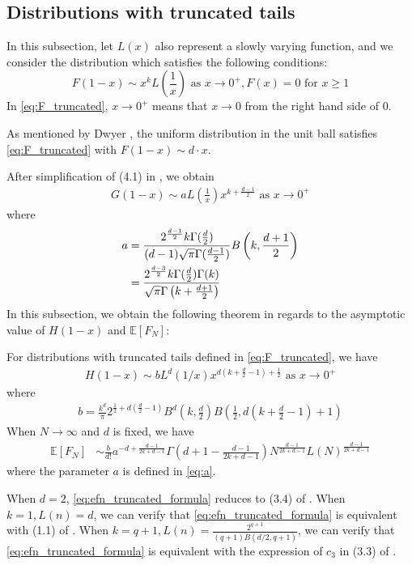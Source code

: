 \documentclass{aptpub}
\def\E{\mathbb{E}}
\begin{document}
\subsection{Distributions with truncated tails}
In this subsection, let $L(x)$ also represent a slowly varying function, and we consider the distribution which satisfies
the following conditions:
\begin{equation}\label{eq:F_truncated}
     F(1-x) \sim x^k L\left(\frac{1}{x} \right)  \text{ as } x \to 0^+,
     F(x) = 0 \text{ for } x \geq 1
\end{equation}
In \eqref{eq:F_truncated}, $x \to 0^+$ means that $x\to 0$ from the right hand side of $0$.

As mentioned by Dwyer \cite{dwyer1991convex}, the uniform distribution
in the unit ball satisfies \eqref{eq:F_truncated} with
$F(1-x) \sim d\cdot x$.

After simplification of (4.1) in \cite{dwyer1991convex}, we obtain
\begin{align}
    G(1-x) \sim a
    L\left(\frac{1}{x} \right)
    x^{k+\frac{d-1}{2}} \textrm{ as } x \to 0^+ 
    \label{eq:truncated_G_1_x}
\end{align}
where
\begin{align}
a &=\frac{2^{\frac{d-1}{2}} k \Gamma(\frac{d}{2})}
    {(d-1) \sqrt{\pi} \Gamma(\frac{d-1}{2})}
    B\left(k, \frac{d+1}{2}\right) \notag \\
    &= \frac{2^{\frac{d-3}{2}} k \Gamma(\frac{d}{2})\Gamma(k)}
    {\sqrt{\pi} \Gamma\left(k+\frac{d+1}{2}\right)}
    \label{eq:a}
\end{align}
In this subsection, we obtain the following theorem in regards to the asymptotic value of $H(1-x)$ and $\E[F_N]$:
\begin{theorem}
     For distributions with truncated tails
     defined in \eqref{eq:F_truncated},
     we have
\begin{align}
     H(1-x)  \sim b
     L^d(1/x) x^{d(k+\frac{d}{2}-1)+\frac{1}{2}} 
     \textrm{ as } x \to 0^+ \label{eq:truncated_H_1_x}
\end{align}
where
\begin{align}
     b =  \frac{k^d}{\pi}
     2^{\frac{1}{2} + d(\frac{d}{2}-1)} B^d\left(k, \frac{d}{2}\right)
     B\left( \frac{1}{2},
     d(k+\frac{d}{2} -1)+1 \right)
     \label{eq:b}
 \end{align}
When $N\to \infty$ and $d$ is fixed, we have
 \begin{align}\label{eq:efn_truncated_formula}
     \E[F_N] &\sim \frac{b}{d!}a^{-d+\frac{d-1}{2k+d-1}}
     \Gamma 
     \left(d+1-\frac{d-1}{2k+d-1}\right)
     N^{\frac{d-1}{2k+d-1}}
     L(N)
     ^{\frac{d-1}{2k+d-1}}
 \end{align}
 where the parameter $a$ is defined in \eqref{eq:a}.
\end{theorem}
 When $d=2$, \eqref{eq:efn_truncated_formula} reduces to (3.4) of \cite{carnal1970konvexe}.
 When $k=1, L(n)=d$, we can verify that
 \eqref{eq:efn_truncated_formula} is equivalent with (1.1)
 of \cite{raynaud1970enveloppe}.
 When $k=q+1, L(n)=\frac{2^{q+1}}{(q+1)B(d/2,q+1)}$,
 we can verify that
 \eqref{eq:efn_truncated_formula} is equivalent with the expression of $c_3$
 in (3.3) of \cite{affentranger1991convex}.
\end{document}
